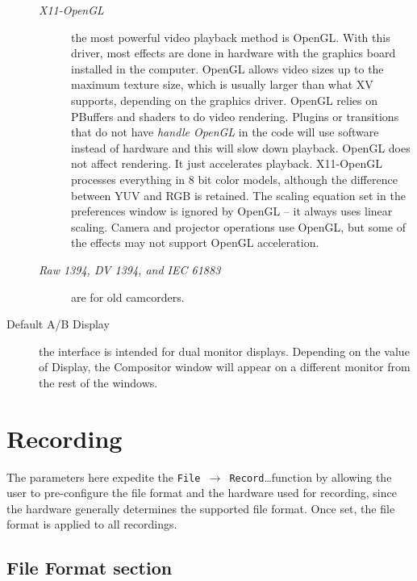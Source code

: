 \begin{description}
\begin{description}
        \item[\textit{X11-OpenGL}] the most powerful video playback method is OpenGL. With this driver, most effects are done in hardware with the graphics board installed in the computer. OpenGL allows video sizes up to the maximum texture size, which is usually larger than what XV supports, depending on the graphics driver.  OpenGL relies on PBuffers and shaders to do video rendering.  Plugins or transitions that do not  have \textit{handle OpenGL} in the code will use software instead of hardware and this will slow down playback.       
        OpenGL does not affect rendering. It just accelerates playback.  X11-OpenGL processes everything in 8 bit color models, although the difference between YUV and RGB is retained. The scaling equation set in the preferences window is ignored by OpenGL -- it always uses linear scaling. Camera and projector operations use OpenGL, but some of the effects may not support OpenGL acceleration.
        \item[\textit{Raw 1394, DV 1394, and IEC 61883}] are for old camcorders.
    \end{description}
    \item[Default A/B Display] the interface is intended for dual monitor displays. Depending on the value of Display, the Compositor window will appear on a different monitor from the rest of the windows.
\end{description}

\section{Recording}%
\label{sec:recording}

The parameters here expedite the \texttt{File $\rightarrow$ Record}\dots function by allowing the user to pre-configure the file format and the hardware used for recording, since the hardware generally determines the supported file format. Once set, the file format is applied to all recordings.

\subsection{File Format section}%
\label{sub:file_format_section}

